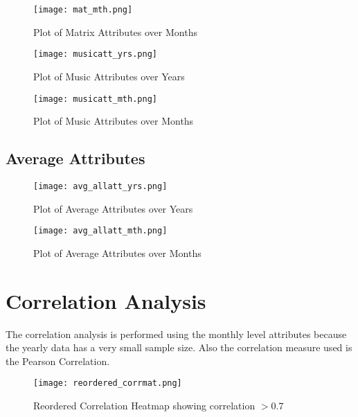 \begin{figure}[H]
    \centering
    \texttt{[image: mat\_mth.png]}
    \caption{Plot of Matrix Attributes over Months}
    \label{fig:mat mth}
\end{figure}

\begin{figure}[H]
    \centering
    \texttt{[image: musicatt\_yrs.png]}
    \caption{Plot of Music Attributes over Years}
    \label{fig:music yrs}
\end{figure}

\begin{figure}[H]
    \centering
    \texttt{[image: musicatt\_mth.png]}
    \caption{Plot of Music Attributes over Months}
    \label{fig:music mth}
\end{figure}

\clearpage{}
\subsection{Average Attributes}

\begin{figure}[H]
    \centering
    \texttt{[image: avg\_allatt\_yrs.png]}
    \caption{Plot of Average Attributes over Years}
    \label{fig:avg all yrs}
\end{figure}

\begin{figure}[H]
    \centering
    \texttt{[image: avg\_allatt\_mth.png]}
    \caption{Plot of Average Attributes over Months}
    \label{fig:avg all mth}
\end{figure}

\clearpage{}
\section{Correlation Analysis}\label{corrfig}
 The correlation analysis is performed using the monthly level attributes because the yearly data has a very small sample size. Also the correlation measure used is the Pearson Correlation.\\

\begin{figure}[H]
    \centering
    \texttt{[image: reordered\_corrmat.png]}
    \caption{Reordered Correlation Heatmap showing correlation $> 0.7$}
    \label{fig:Corrmat}
\end{figure}

